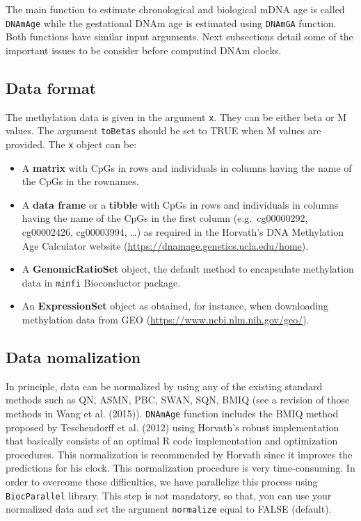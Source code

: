 \documentclass[]{article}
\begin{document}
The main function to estimate chronological and biological mDNA age is called \texttt{DNAmAge} while the gestational DNAm age is estimated using \texttt{DNAmGA} function. Both functions have similar input arguments. Next subsections detail some of the important issues to be consider before computind DNAm clocks.

\hypertarget{data-format}{%
\subsection{Data format}\label{data-format}}

The methylation data is given in the argument \texttt{x}. They can be either beta or M values. The argument \texttt{toBetas} should be set to TRUE when M values are provided. The \texttt{x} object can be:

\begin{itemize}
\item
  A \textbf{matrix} with CpGs in rows and individuals in columns having the name of the CpGs in the rownames.
\item
  A \textbf{data frame} or a \textbf{tibble} with CpGs in rows and individuals in columns having the name of the CpGs in the first column (e.g.~cg00000292, cg00002426, cg00003994, \ldots{}) as required in the Horvath's DNA Methylation Age Calculator website (\url{https://dnamage.genetics.ucla.edu/home}).
\item
  A \textbf{GenomicRatioSet} object, the default method to encapsulate methylation data in \texttt{minfi} Bioconductor package.
\item
  An \textbf{ExpressionSet} object as obtained, for instance, when downloading methylation data from GEO (\url{https://www.ncbi.nlm.nih.gov/geo/}).
\end{itemize}

\hypertarget{data-nomalization}{%
\subsection{Data nomalization}\label{data-nomalization}}

In principle, data can be normalized by using any of the existing standard methods such as QN, ASMN, PBC, SWAN, SQN, BMIQ (see a revision of those methods in Wang et al. (2015)). \texttt{DNAmAge} function includes the BMIQ method proposed by Teschendorff et al. (2012) using Horvath's robust implementation that basically consists of an optimal R code implementation and optimization procedures. This normalization is recommended by Horvath since it improves the predictions for his clock. This normalization procedure is very time-consuming. In order to overcome these difficulties, we have parallelize this process using \texttt{BiocParallel} library. This step is not mandatory, so that, you can use your normalized data and set the argument \texttt{normalize} equal to FALSE (default).
\end{document}
